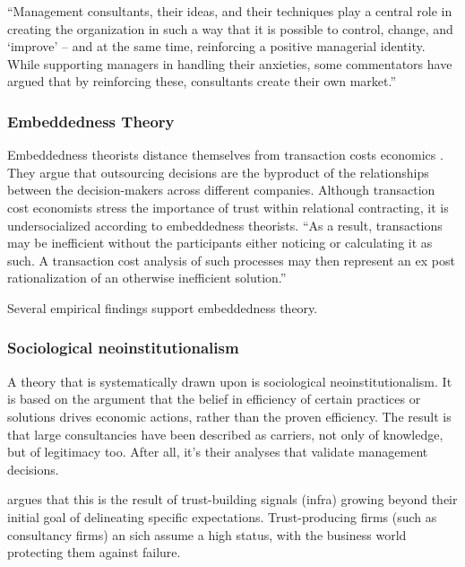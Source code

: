 \documentclass[12pt]{article}
\begin{document}
``Management consultants, their ideas, and their techniques play a
central role in creating the organization in such a way that it is
possible to control, change, and `improve' -- and at the same time,
reinforcing a positive managerial identity. While supporting managers in
handling their anxieties, some commentators have argued that by
reinforcing these, consultants create their own market.'' \citep[
48]{werr2002}

\hypertarget{embeddedness-theory}{%
\subsubsection{Embeddedness Theory}\label{embeddedness-theory}}

Embeddedness theorists distance themselves from transaction costs
economics \citep[ 14-16]{armbruster2006}. They argue that outsourcing
decisions are the byproduct of the relationships between the
decision-makers across different companies. Although transaction cost
economists stress the importance of trust within relational contracting,
it is undersocialized according to embeddedness theorists. ``As a
result, transactions may be inefficient without the participants either
noticing or calculating it as such. A transaction cost analysis of such
processes may then represent an ex post rationalization of an otherwise
inefficient solution.'' \citep[ 15]{armbruster2006}

Several empirical findings support embeddedness theory.

\hypertarget{sociological-neoinstitutionalism}{%
\subsubsection{Sociological
neoinstitutionalism}\label{sociological-neoinstitutionalism}}

A theory that is systematically drawn upon \citep[ 6-8]{armbruster2006}
is sociological neoinstitutionalism. It is based on the argument that
the belief in efficiency of certain practices or solutions drives
economic actions, rather than the proven efficiency. The result is that
large consultancies have been described as carriers, not only of
knowledge, but of legitimacy too. After all, it's their analyses that
validate management decisions.

\citet[20-21]{zucker1985} argues that this is the result of
trust-building signals (infra) growing beyond their initial goal of
delineating specific expectations. Trust-producing firms (such as
consultancy firms) an sich assume a high status, with the business world
protecting them against failure.
\end{document}
